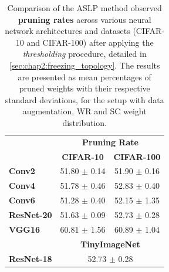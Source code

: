 \begin{table}[htbp]
  \centering\begin{tabular}{lcc}
    \cmidrule[\heavyrulewidth]{2-3}
    & \multicolumn{2}{c}{\textbf{Pruning Rate}}\\
    & \textbf{CIFAR-10} & \textbf{CIFAR-100}\\
    \toprule
    \textbf{Conv2} & 51.80 $\pm$ 0.14 & 51.90 $\pm$ 0.16\\
    \textbf{Conv4} & 51.78 $\pm$ 0.46 & 52.83 $\pm$ 0.40\\
    \textbf{Conv6} & 51.28 $\pm$ 0.40 & 52.15 $\pm$ 1.35\\
    \textbf{ResNet-20} & 51.63 $\pm$ 0.09 & 52.73 $\pm$ 0.28\\
    \textbf{VGG16} & 60.81 $\pm$ 1.56 & 60.89 $\pm$ 1.04\\
    \midrule
    & \multicolumn{2}{c}{\textbf{TinyImageNet}} \\
    \textbf{ResNet-18} & \multicolumn{2}{c}{52.73 $\pm$ 0.28}\\
    \bottomrule
    \end{tabular}
  \caption{Comparison of the \ac{ASLP} method observed \textbf{pruning rates} across
    various neural network architectures and datasets (CIFAR-10 and CIFAR-100)
    after applying the \emph{thresholding} procedure, detailed in
    \cref{sec:chap2:freezing_topology}. The results are presented as mean
    percentages of pruned weights with their respective standard deviations, for
    the setup with data augmentation, \acf{WR} and \acf{SC} weight
    distribution.}
  \label{tab:chap2:observed_sparsity}
\end{table}


